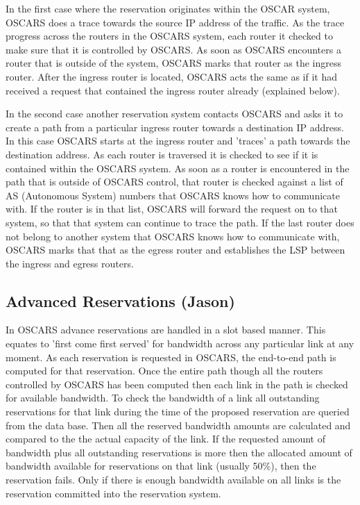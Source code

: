 \documentclass[conference]{IEEEtran}
\begin{document}
In the first case where the reservation originates within the OSCAR system,
OSCARS does a trace towards the source IP address of the traffic. As the trace
progress across the routers in the OSCARS system, each router it checked to make
sure that it is controlled by OSCARS. As soon as OSCARS encounters a router that
is outside of the system, OSCARS marks that router as the ingress router. After
the ingress router is located, OSCARS acts the same as if it had received a
request that contained the ingress router already (explained below).

In the second case another reservation system contacts OSCARS and asks it to
create a path from a particular ingress router towards a destination IP address.
In this case OSCARS starts at the ingress router and 'traces' a path towards the
destination address. As each router is traversed it is checked to see if it is
contained within the OSCARS system. As soon as a router is encountered in the
path that is outside of OSCARS control, that router is checked against a list of
AS (Autonomous System) numbers that OSCARS knows how to communicate with. If the
router is in that list, OSCARS will forward the request on to that system, so
that that system can continue to trace the path. If the last router does not
belong to another system that OSCARS knows how to communicate with, OSCARS marks
that that as the egress router and establishes the LSP between the ingress and
egress routers.

\subsection{Advanced Reservations (Jason)}
In OSCARS advance reservations are handled in a slot based manner. This equates
to 'first come first served' for bandwidth across any particular link at any
moment. As each reservation is requested in OSCARS, the end-to-end path is
computed for that reservation. Once the entire path though all the routers
controlled by OSCARS has been computed then each link in the path is checked for
available bandwidth. To check the bandwidth of a link all outstanding
reservations for that link during the time of the proposed reservation are
queried from the data base. Then all the reserved bandwidth amounts are
calculated and compared to the the actual capacity of the link. If the requested
amount of bandwidth plus all outstanding reservations is more then the allocated
amount of bandwidth available for reservations on that link (usually
50\%), then the reservation fails. Only if there is enough bandwidth 
available on all links is the reservation committed into the reservation system.
\end{document}

